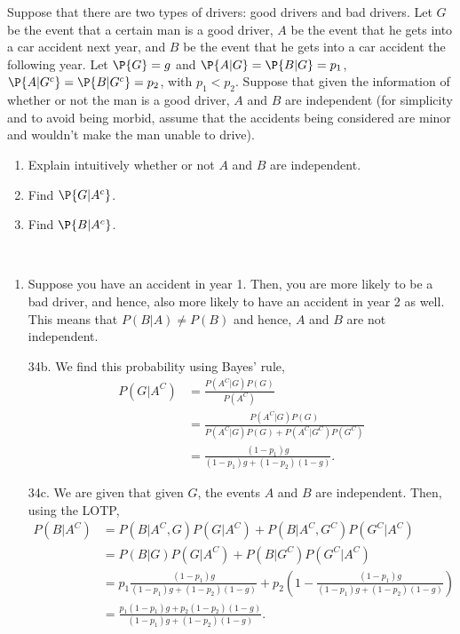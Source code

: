 

\setcounter{theorem}{15}

\begin{exercise} [BH.2.34] 
Suppose that there are two types of drivers: good drivers and bad drivers. Let $G$ be the event that a certain man is a good driver, $A$ be the event that he gets into a car accident next year, and $B$ be the event that he gets into a car accident the following year. Let $\P{G} = g$ and $\P{A|G} = \P{B|G} = p_1$, $\P{A|G^c} = \P{B|G^c} = p_2$, with $p_1 < p_2$. Suppose that given the information of whether or not the man is a good driver, $A$ and $B$ are independent (for simplicity and to avoid being morbid, assume that the accidents being considered are minor and wouldn’t make the man unable to drive).
	\begin{enumerate}
		\item Explain intuitively whether or not $A$ and $B$ are independent.
		\item Find $\P{G|A^c}$.
		\item Find $\P{B|A^c}$.
	\end{enumerate}
\begin{solution}~
	\begin{enumerate}
		\item Suppose you have an accident in year 1. Then, you are more likely to be a bad driver, and hence, also more likely to have an accident in year 2 as well. This means that $P(B|A)\neq P(B)$ and hence, $A$ and $B$ are not independent.
		\item[34b.] We find this probability using Bayes' rule,
		\begin{align*}
			P(G|A^{C})& =\frac{P(A^{C}|G)P(G)}{P(A^{C})}\\ &=\frac{P(A^{C}|G)P(G)}{P(A^{C}|G)P(G) + P(A^{C}|G^C)P(G^C)}\\
			&= \frac{(1-p_{1})g}{(1-p_{1})g + (1-p_{2})(1-g)}.
		\end{align*}
		\item[34c.] We are given that given $G$, the events $A$ and $B$ are independent. Then, using the LOTP,
 		\begin{align*}
			P(B|A^{C})& = P(B|A^{C},G)P(G|A^{C}) + P(B|A^{C},G^{C})P(G^{C}|A^{C})\\
			&=P(B|G)P(G|A^{C}) + P(B|G^{C})P(G^{C}|A^{C})\\
			&=p_{1}\frac{(1-p_{1})g}{(1-p_{1})g + (1-p_{2})(1-g)} + p_{2}\left(1-\frac{(1-p_{1})g}{(1-p_{1})g + (1-p_{2})(1-g)}\right)\\
			&=\frac{p_{1}(1-p_{1})g + p_{2}(1-p_{2})(1-g)}{(1-p_{1})g + (1-p_{2})(1-g)}.
		\end{align*}
	\end{enumerate}
\end{solution}
\end{exercise}


